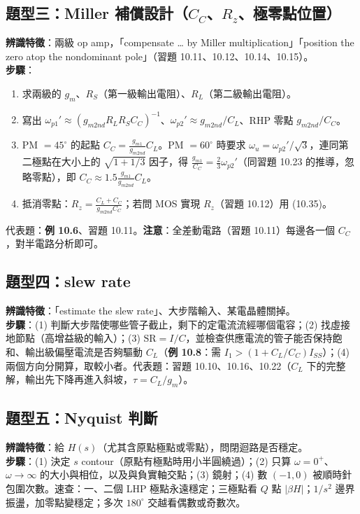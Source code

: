 \documentclass[11pt,a4paper]{article}
\newcommand{\exref}[1]{\textcolor{extag}{\textbf{\sffamily 例 #1}}}
\begin{document}
\subsection{題型三：Miller 補償設計（$C_C$、$R_z$、極零點位置）}
\textbf{辨識特徵}：兩級 op amp，「compensate \ldots{} by Miller multiplication」「position the zero atop the nondominant pole」（習題 10.11、10.12、10.14、10.15）。\\
\textbf{步驟}：
\begin{enumerate}[leftmargin=2.2em,itemsep=0pt]
  \item 求兩級的 $g_m$、$R_S$（第一級輸出電阻）、$R_L$（第二級輸出電阻）。
  \item 寫出 $\omega_{p1}'\approx(g_{m2nd}R_LR_SC_C)^{-1}$、$\omega_{p2}'\approx g_{m2nd}/C_L$、RHP 零點 $g_{m2nd}/C_C$。
  \item PM $=45^\circ$ 的起點 $C_C=\frac{g_{m1}}{g_{m2nd}}C_L$。PM $=60^\circ$ 時要求 $\omega_u=\omega_{p2}'/\sqrt3$，連同第二極點在大小上的 $\sqrt{1+1/3}$ 因子，得 $\frac{g_{m1}}{C_C}=\frac23\omega_{p2}'$（同習題 10.23 的推導，忽略零點），即 $C_C\approx1.5\frac{g_{m1}}{g_{m2nd}}C_L$。
  \item 抵消零點：$R_z=\frac{C_L+C_C}{g_{m2nd}C_C}$；若問 MOS 實現 $R_z$（習題 10.12）用 (10.35)。
\end{enumerate}
代表題：\exref{10.6}、習題 10.11。\textbf{注意}：全差動電路（習題 10.11）每邊各一個 $C_C$，對半電路分析即可。

\subsection{題型四：slew rate}
\textbf{辨識特徵}：「estimate the slew rate」、大步階輸入、某電晶體關掉。\\
\textbf{步驟}：(1) 判斷大步階使哪些管子截止，剩下的定電流流經哪個電容；(2) 找虛接地節點（高增益級的輸入）；(3) $\text{SR}=I/C$，並檢查供應電流的管子能否保持飽和、輸出級偏壓電流是否夠驅動 $C_L$（\exref{10.8}：需 $I_1>(1+C_L/C_C)I_{SS}$）；(4) 兩個方向分開算，取較小者。代表題：習題 10.10、10.16、10.22（$C_L$ 下的完整解，輸出先下降再進入斜坡，$\tau=C_L/g_m$）。

\subsection{題型五：Nyquist 判斷}
\textbf{辨識特徵}：給 $H(s)$（尤其含原點極點或零點），問閉迴路是否穩定。\\
\textbf{步驟}：(1) 決定 $s$ contour（原點有極點時用小半圓繞過）；(2) 只算 $\omega=0^+$、$\omega\to\infty$ 的大小與相位，以及與負實軸交點；(3) 鏡射；(4) 數 $(-1,0)$ 被順時針包圍次數。速查：一、二個 LHP 極點永遠穩定；三極點看 $Q$ 點 $|\beta H|$；$1/s^2$ 邊界振盪，加零點變穩定；多次 $180^\circ$ 交越看偶數或奇數次。
\end{document}
